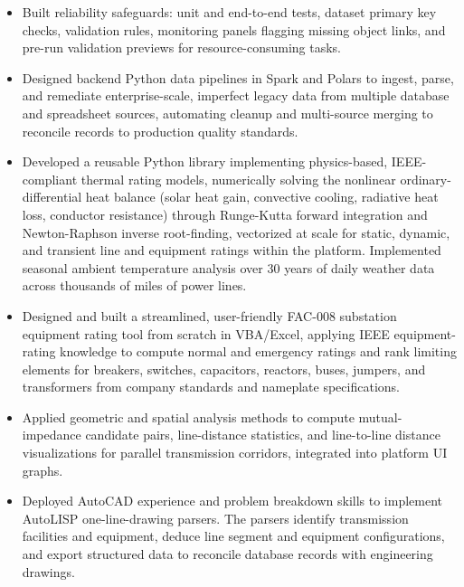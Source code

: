 \documentclass[10pt, letterpaper]{article}
\newenvironment{rlist}{%
  \begin{itemize}[leftmargin=1.4em, itemsep=1pt, topsep=2pt, parsep=0pt]%
}{%
  \end{itemize}%
}
\begin{document}
\begin{rlist}
  \item Built reliability safeguards: unit and end-to-end tests, dataset primary key checks, validation rules, monitoring panels flagging missing object links, and pre-run validation previews for resource-consuming tasks.
  \item Designed backend Python data pipelines in Spark and Polars to ingest, parse, and remediate enterprise-scale, imperfect legacy data from multiple database and spreadsheet sources, automating cleanup and multi-source merging to reconcile records to production quality standards.
  \item Developed a reusable Python library implementing physics-based, IEEE-compliant thermal rating models, numerically solving the nonlinear ordinary-differential heat balance (solar heat gain, convective cooling, radiative heat loss, conductor resistance) through Runge-Kutta forward integration and Newton-Raphson inverse root-finding, vectorized at scale for static, dynamic, and transient line and equipment ratings within the platform. Implemented seasonal ambient temperature analysis over 30 years of daily weather data across thousands of miles of power lines.
  \item Designed and built a streamlined, user-friendly FAC-008 substation equipment rating tool from scratch in VBA/Excel, applying IEEE equipment-rating knowledge to compute normal and emergency ratings and rank limiting elements for breakers, switches, capacitors, reactors, buses, jumpers, and transformers from company standards and nameplate specifications.
  \item Applied geometric and spatial analysis methods to compute mutual-impedance candidate pairs, line-distance statistics, and line-to-line distance visualizations for parallel transmission corridors, integrated into platform UI graphs.
  \item Deployed AutoCAD experience and problem breakdown skills to implement AutoLISP one-line-drawing parsers. The parsers identify transmission facilities and equipment, deduce line segment and equipment configurations, and export structured data to reconcile database records with engineering drawings.
\end{rlist}
\end{document}
